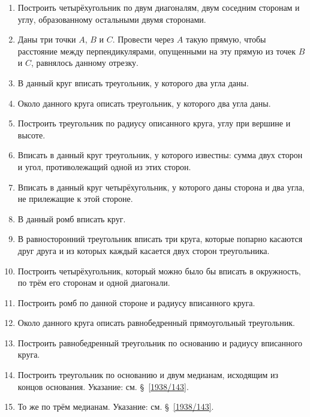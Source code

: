 \documentclass[oneside]{book}
\begin{document}
\begin{enumerate}[resume]
 \item
Построить четырёхугольник по двум диагоналям, двум соседним сторонам и углу, образованному остальными двумя сторонами.

 \item
Даны три точки $A$, $B$ и $C$.
Провести через $A$ такую прямую, чтобы расстояние между перпендикулярами, опущенными на эту прямую из точек $B$ и $C$, равнялось данному отрезку.

 \item
В данный круг вписать треугольник, у которого два угла даны.

 \item
Около данного круга описать треугольник, у которого два угла даны.

 \item
Построить треугольник по радиусу описанного круга, углу при вершине и высоте.

 \item
Вписать в данный круг треугольник, у которого известны:
сумма двух сторон и угол, противолежащий одной из этих сторон.

 \item
Вписать в данный круг четырёхугольник, у которого даны сторона и два угла, не прилежащие к этой стороне.

 \item
В данный ромб вписать круг.

 \item
В равносторонний треугольник вписать три круга, которые попарно касаются друг друга и из которых каждый касается двух сторон треугольника.

 \item
Построить четырёхугольник, который можно было бы вписать в окружность, по трём его сторонам и одной диагонали.

 \item
Построить ромб по данной стороне и радиусу вписанного круга.

 \item
Около данного круга описать равнобедренный прямоугольный треугольник.

 \item
Построить равнобедренный треугольник по основанию и радиусу вписанного круга.

 \item
Построить треугольник по основанию и двум медианам, исходящим из концов основания.
Указание: см. §~\ref{1938/143}.

 \item
То же по трём медианам.
Указание: см. §~\ref{1938/143}.


\end{enumerate}
\end{document}
